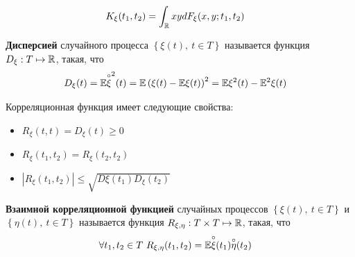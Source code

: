 \begin{align*}
& K_\xi(t_1, t_2) = \int_{\mathbb{R}} xy dF_\xi(x,y;t_1,t_2)
\end{align*}
\begin{Def}
\textbf{Дисперсией} случайного процесса $\left\{\xi(t), \ t \in T\right\}$ называется функция $D_\xi: T \mapsto \mathbb{R}$, такая, что
\begin{align*}
& D_\xi(t) = \mathbb{E} \overset{\circ}{\xi}^2(t) = \mathbb{E} \left(\xi(t) - \mathbb{E} \xi(t)\right)^2 = \mathbb{E} \xi^2(t) - \mathbb{E}^2 \xi(t)
\end{align*}
\end{Def}
Корреляционная функция имеет следующие свойства:
\begin{itemize}
\item $R_\xi(t,t) = D_\xi(t) \geq 0$
\item $R_\xi(t_1,t_2) = R_\xi(t_2,t_2)$
\item $\left|R_\xi(t_1,t_2)\right|\leq \sqrt{D\xi(t_1)D_\xi(t_2)}$
\end{itemize}
\begin{Def}
\textbf{Взаимной корреляционной функцией} случайных процессов $\left\{\xi(t), \ t \in T\right\}$ и $\left\{\eta(t), \ t \in T\right\}$ называется функция $R_{\xi, \eta}: T\times T \mapsto \mathbb{R}$, такая, что
\begin{align*}
& \forall t_1, t_2 \in T \ R_{\xi, \eta}(t_1, t_2) = \mathbb{E} \overset{\circ}{\xi}(t_1)\overset{\circ}{\eta}(t_2)
\end{align*}
\end{Def}
